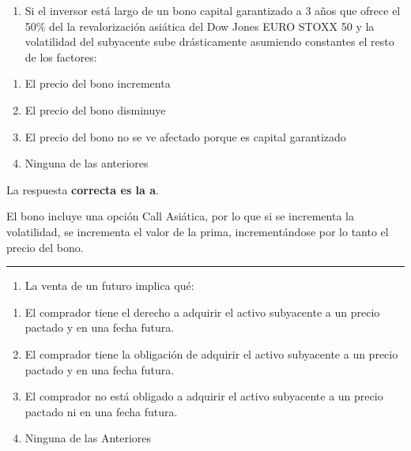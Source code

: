 \documentclass[
  letterpaper,
  DIV=11,
  numbers=noendperiod]{scrreprt}
\providecommand{\tightlist}{%
  \setlength{\itemsep}{0pt}\setlength{\parskip}{0pt}}\usepackage{longtable,booktabs,array}
\begin{document}
\begin{enumerate}
\def\labelenumi{\arabic{enumi}.}
\setcounter{enumi}{39}
\tightlist
\item
  Si el inversor está largo de un bono capital garantizado a 3 años que
  ofrece el 50\% del la revalorización asiática del Dow Jones EURO STOXX
  50 y la volatilidad del subyacente sube drásticamente asumiendo
  constantes el resto de los factores:
\end{enumerate}

\begin{enumerate}
\def\labelenumi{\alph{enumi})}
\item
  El precio del bono incrementa
\item
  El precio del bono disminuye
\item
  El precio del bono no se ve afectado porque es capital garantizado
\item
  Ninguna de las anteriores
\end{enumerate}

\begin{tcolorbox}[enhanced jigsaw, left=2mm, opacityback=0, colback=white, breakable, arc=.35mm, bottomrule=.15mm, rightrule=.15mm, toprule=.15mm, leftrule=.75mm, colframe=quarto-callout-tip-color-frame]
\begin{minipage}[t]{5.5mm}
\textcolor{quarto-callout-tip-color}{\faLightbulb}
\end{minipage}%
\begin{minipage}[t]{\textwidth - 5.5mm}

La respuesta \textbf{correcta es la a}.

El bono incluye una opción Call Asiática, por lo que si se incrementa la
volatilidad, se incrementa el valor de la prima, incrementándose por lo
tanto el precio del bono.

\end{minipage}%
\end{tcolorbox}

\begin{center}\rule{0.5\linewidth}{0.5pt}\end{center}

\begin{enumerate}
\def\labelenumi{\arabic{enumi}.}
\setcounter{enumi}{40}
\tightlist
\item
  La venta de un futuro implica qué:
\end{enumerate}

\begin{enumerate}
\def\labelenumi{\alph{enumi})}
\item
  El comprador tiene el derecho a adquirir el activo subyacente a un
  precio pactado y en una fecha futura.
\item
  El comprador tiene la obligación de adquirir el activo subyacente a un
  precio pactado y en una fecha futura.
\item
  El comprador no está obligado a adquirir el activo subyacente a un
  precio pactado ni en una fecha futura.
\item
  Ninguna de las Anteriores
\end{enumerate}
\end{document}

